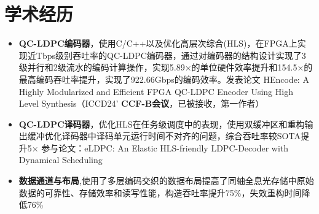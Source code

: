 \documentclass{resume} %
\begin{document}






\section{学术经历}

\begin{itemize} [parsep=0.5ex]
  \item \textbf{QC-LDPC编码器}，使用C/C++以及优化高层次综合(HLS)，在FPGA上实现近Tbps级别吞吐率的QC-LDPC编码器，通过对编码器的结构设计实现了3级并行和2级流水的编码计算操作，实现5.89×的单位硬件效率提升和154.5×的最高编码吞吐率提升，实现了922.66Gbps的编码效率。发表论文 HEncode: A Highly Modularized and Efficient FPGA QC-LDPC Encoder Using High Level Synthesis（ICCD24' \textbf{CCF-B会议}，已被接收，第一作者）
  \item \textbf{QC-LDPC译码器}，优化HLS在任务级调度中的表现，使用双缓冲区和重构输出缓冲优化译码器中译码单元运行时间不对齐的问题，综合吞吐率较SOTA提升5×
  参与论文：eLDPC: An Elastic HLS-friendly LDPC-Decoder with Dynamical Scheduling
  \item \textbf{数据通道与布局},使用了多层编码交织的数据布局提高了同轴全息光存储中原始数据的可靠性、存储效率和读写性能，构造吞吐率提升75\%，失效重构时间降低76\%
\end{itemize}
\end{document}
